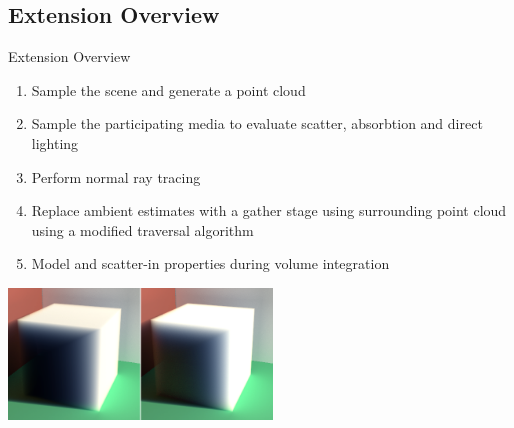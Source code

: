 \documentclass[10pt,compress,professionalfont]{beamer}
\begin{document}
\subsection{Extension Overview}
\begin{frame}{Extension Overview}

    \begin{enumerate}
        \item Sample the scene and generate a point cloud
        \item \alert{ Sample the participating media to evaluate scatter, absorbtion and direct lighting}
        \item Perform normal ray tracing
        \item Replace ambient estimates with a gather stage using surrounding point cloud \alert{using a modified traversal algorithm}
        \item \alert{ Model and scatter-in properties during volume integration}
    \end{enumerate}
    \vspace{4mm}
    {\centering
        \includegraphics[width=70mm]{../img/inscat_comp2}\\
    }

\end{frame}
\end{document}
